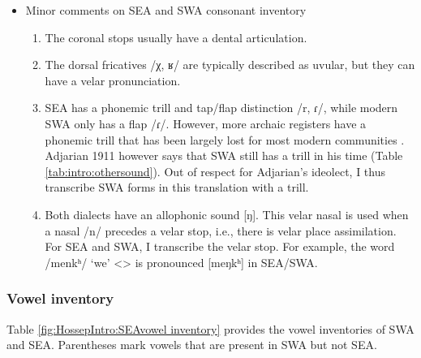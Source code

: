 \begin{itemize}
	\item Minor comments on SEA and SWA consonant inventory 
	\begin{enumerate}
		\item The coronal stops usually have a dental articulation. 
		\item The dorsal fricatives /χ, ʁ/ are typically described as uvular, but they can have a velar pronunciation. 
		\item SEA has a phonemic trill and tap/flap distinction /r, ɾ/, while modern SWA only has a flap /ɾ/. However, more archaic registers have a phonemic trill that has been largely lost for most modern communities \citep{Tahtadjian-2020-WesterArmenianRhoticDifferentialPhoneticStudy}. Adjarian 1911 however says that SWA still has a trill in his time (Table \ref{tab:intro:othersound}).  Out of respect for Adjarian's ideolect, I thus transcribe SWA forms in this translation with a trill. 
		\item Both dialects   have an allophonic sound [ŋ]. This velar nasal is used when a nasal /n/ precedes a velar stop, i.e., there is velar place assimilation. For SEA and SWA, I transcribe the velar stop. For example, the word /menkʰ/ `we' <> is pronounced [meŋkʰ] in SEA/SWA.  
		
	\end{enumerate}
\end{itemize}

\subsubsection{Vowel inventory}\label{sec:HossepIntro:phonotransc:modern:vowe}
Table \ref{fig:HossepIntro:SEAvowel inventory} provides the vowel inventories of SWA and SEA. Parentheses mark vowels that are present in SWA but not SEA. 

